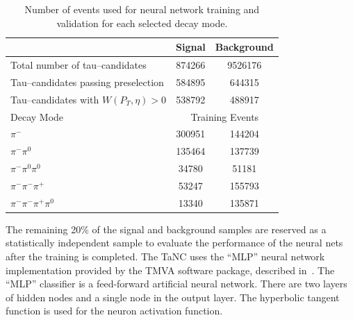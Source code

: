 \begin{table}
   \centering
   \begin{tabular}{lcc}
                                                & Signal        & Background    \\
      \hline
      Total number of tau--candidates           & 874266        & 9526176       \\
      Tau--candidates passing preselection      & 584895        & 644315        \\
      Tau--candidates with $W(P_T,\eta)>0$      & 538792        & 488917        \\
      \hline
      Decay Mode                        & \multicolumn{2}{c}{Training Events}   \\
      \hline
      $\pi^{-}$                         & 300951   & 144204                     \\
      $\pi^{-}\pi^0$                    & 135464   & 137739                     \\
      $\pi^{-}\pi^0\pi^0$               & 34780    & 51181                      \\
      $\pi^{-}\pi^{-}\pi^{+}$           & 53247    & 155793                     \\
      $\pi^{-}\pi^{-}\pi^{+}\pi^0$      & 13340    & 135871                     \\
   \end{tabular}
   \label{tab:trainingEvents}
   \caption{Number of events used for neural network training and validation for each
   selected decay mode.}
\end{table}

The remaining 20\% of the signal and background samples are
reserved as a statistically independent sample to evaluate the performance of
the neural nets after the training is completed.  The TaNC uses the ``MLP''
neural network implementation provided by the TMVA software package, described
in~\cite{TMVA}.  The ``MLP'' classifier is a feed-forward artificial neural
network. There are two layers of hidden nodes and a single node in the output
layer.  The hyperbolic tangent function is used for the neuron activation
function.  

